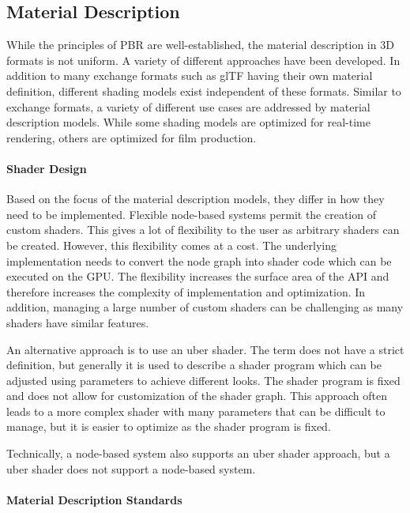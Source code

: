 \subsection*{Material Description}

While the principles of \gls{PBR} are well-established, the material description in 3D formats is not uniform. A variety of different approaches have been developed. In addition to many exchange formats such as \gls{glTF} having their own material definition, different shading models exist independent of these formats. Similar to exchange formats, a variety of different use cases are addressed by material description models. While some shading models are optimized for real-time rendering, others are optimized for film production.

\paragraph{Shader Design}

Based on the focus of the material description models, they differ in how they need to be implemented. Flexible node-based systems permit the creation of custom shaders. This gives a lot of flexibility to the user as arbitrary shaders can be created. However, this flexibility comes at a cost. The underlying implementation needs to convert the node graph into shader code which can be executed on the \gls{GPU}. The flexibility increases the surface area of the \gls{API} and therefore increases the complexity of implementation and optimization. In addition, managing a large number of custom shaders can be challenging as many shaders have similar features.

An alternative approach is to use an \gls{uber shader}. The term does not have a strict definition, but generally it is used to describe a shader program which can be adjusted using parameters to achieve different looks. The shader program is fixed and does not allow for customization of the shader graph. This approach often leads to a more complex shader with many parameters that can be difficult to manage, but it is easier to optimize as the shader program is fixed.

Technically, a node-based system also supports an \gls{uber shader} approach, but a \gls{uber shader} does not support a node-based system.

\paragraph{Material Description Standards}
\label{ch:materialDescriptionStandards}

